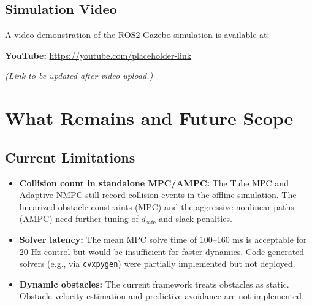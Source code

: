 \documentclass[12pt, a4paper]{article}
\begin{document}
\subsection{Simulation Video}
A video demonstration of the ROS2 Gazebo simulation is available at:

\vspace{0.3cm}
\noindent\textbf{YouTube:} \url{https://youtube.com/placeholder-link}
\vspace{0.3cm}

\noindent\textit{(Link to be updated after video upload.)}


\section{What Remains and Future Scope}

\subsection{Current Limitations}
\begin{itemize}
    \item \textbf{Collision count in standalone MPC/AMPC:} The Tube MPC and Adaptive NMPC still record collision events in the offline simulation. The linearized obstacle constraints (MPC) and the aggressive nonlinear paths (AMPC) need further tuning of $d_{\text{safe}}$ and slack penalties.
    \item \textbf{Solver latency:} The mean MPC solve time of 100--160 ms is acceptable for 20 Hz control but would be insufficient for faster dynamics. Code-generated solvers (e.g., via \texttt{cvxpygen}) were partially implemented but not deployed.
    \item \textbf{Dynamic obstacles:} The current framework treats obstacles as static. Obstacle velocity estimation and predictive avoidance are not implemented.
\end{itemize}
\end{document}
